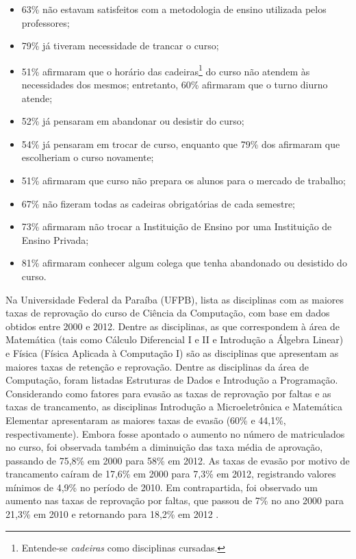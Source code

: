 \begin{itemize}
\item 63\% não estavam satisfeitos com a metodologia de ensino utilizada pelos professores;
\item 79\% já tiveram necessidade de trancar o curso;
\item 51\% afirmaram que o horário das cadeiras\footnote{Entende-se \textit{cadeiras} como disciplinas cursadas.} do curso não atendem às necessidades dos mesmos; entretanto, 60\% afirmaram que o turno diurno atende;
\item 52\% já pensaram em abandonar ou desistir do curso;
\item 54\% já pensaram em trocar de curso, enquanto que 79\% dos afirmaram que escolheriam o curso novamente;
\item 51\% afirmaram que  curso não prepara os alunos para o mercado de trabalho;
\item 67\% não fizeram todas as cadeiras obrigatórias de cada semestre;
\item 73\% afirmaram não trocar a Instituição de Ensino por uma Instituição de Ensino Privada;
\item 81\% afirmaram conhecer algum colega que tenha abandonado ou desistido do curso. 
\end{itemize}

Na Universidade Federal da Paraíba (UFPB), \citet{duarte2013} lista as disciplinas com as maiores taxas de reprovação do curso de Ciência da Computação, com base em dados obtidos entre 2000 e 2012. Dentre as disciplinas, as que correspondem à área de Matemática (tais como Cálculo Diferencial I e II e Introdução a Álgebra Linear) e Física (Física Aplicada à Computação I) são as disciplinas que apresentam as maiores taxas de retenção e reprovação. Dentre as disciplinas da área de Computação, foram listadas Estruturas de Dados e Introdução a Programação. Considerando como fatores para evasão as taxas de reprovação por faltas e as taxas de trancamento, as disciplinas Introdução a Microeletrônica e Matemática Elementar apresentaram as maiores taxas de evasão (60\% e 44,1\%, respectivamente). Embora fosse apontado o aumento no número de matriculados no curso, foi observada também a diminuição das taxa média de aprovação, passando de 75,8\% em 2000 para 58\% em 2012. As taxas de evasão por motivo de trancamento caíram de 17,6\% em 2000 para 7,3\% em 2012, registrando valores mínimos de 4,9\% no período de 2010. Em contrapartida, foi observado um aumento nas taxas de reprovação por faltas, que passou de 7\% no ano 2000 para 21,3\% em 2010 e retornando para 18,2\% em 2012 \cite{duarte2013_2}. 

